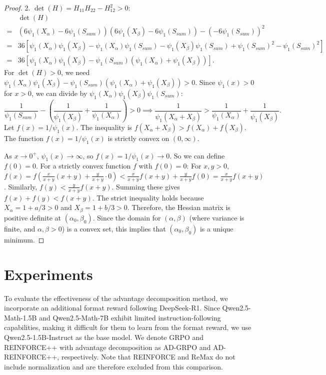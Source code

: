 \documentclass{article}
\theoremstyle{plain}
\theoremstyle{definition}
\theoremstyle{remark}
\begin{document}
\begin{proof}
2. $\det(H) = H_{11}H_{22} - H_{12}^2 > 0$:
\begin{align*} &\det(H) \\
=& (6\psi_1(X_\alpha) - 6\psi_1(S_{sum}))(6\psi_1(X_\beta) - 6\psi_1(S_{sum})) - (-6\psi_1(S_{sum}))^2 \\ 
=& 36 [ \psi_1(X_\alpha)\psi_1(X_\beta) - \psi_1(X_\alpha)\psi_1(S_{sum}) - \psi_1(X_\beta)\psi_1(S_{sum}) + \psi_1(S_{sum})^2 - \psi_1(S_{sum})^2 ] \\ 
=& 36 [ \psi_1(X_\alpha)\psi_1(X_\beta) - \psi_1(S_{sum})(\psi_1(X_\alpha)+\psi_1(X_\beta)) ].\end{align*}
For $\det(H)>0$, we need $\psi_1(X_\alpha)\psi_1(X_\beta) - \psi_1(S_{sum})(\psi_1(X_\alpha)+\psi_1(X_\beta)) > 0$.
Since $\psi_1(x)>0$ for $x>0$, we can divide by $\psi_1(X_\alpha)\psi_1(X_\beta)\psi_1(S_{sum})$:
\[ \frac{1}{\psi_1(S_{sum})} - \left(\frac{1}{\psi_1(X_\beta)} + \frac{1}{\psi_1(X_\alpha)}\right) > 0 \implies \frac{1}{\psi_1(X_\alpha+X_\beta)} > \frac{1}{\psi_1(X_\alpha)} + \frac{1}{\psi_1(X_\beta)}. \]
Let $f(x) = 1/\psi_1(x)$. The inequality is $f(X_\alpha+X_\beta) > f(X_\alpha) + f(X_\beta)$.
The function $f(x)=1/\psi_1(x)$ is strictly convex on $(0, \infty)$.

As $x \to 0^+$, $\psi_1(x) \to \infty$, so $f(x) = 1/\psi_1(x) \to 0$. So we can define $f(0)=0$.
For a strictly convex function $f$ with $f(0)=0$:
For $x,y>0$, $f(x) = f(\frac{x}{x+y}(x+y) + \frac{y}{x+y} \cdot 0) < \frac{x}{x+y}f(x+y) + \frac{y}{x+y}f(0) = \frac{x}{x+y}f(x+y)$.
Similarly, $f(y) < \frac{y}{x+y}f(x+y)$.
Summing these gives $f(x)+f(y) < f(x+y)$.
The strict inequality holds because $X_\alpha = 1+a/3 > 0$ and $X_\beta = 1+b/3 > 0$.
Therefore, the Hessian matrix is positive definite at $(\alpha_0, \beta_0)$. Since the domain for $(\alpha,\beta)$ (where variance is finite, and $\alpha,\beta>0$) is a convex set, this implies that $(\alpha_0, \beta_0)$ is a unique minimum.
\end{proof}




\section{Experiments}
To evaluate the effectiveness of the advantage decomposition method, we incorporate an additional format reward following DeepSeek-R1. Since Qwen2.5-Math-1.5B and Qwen2.5-Math-7B exhibit limited instruction-following capabilities, making it difficult for them to learn from the format reward, we use Qwen2.5-1.5B-Instruct as the base model. We denote GRPO and REINFORCE++ with advantage decomposition as AD-GRPO and AD-REINFORCE++, respectively. Note that REINFORCE and ReMax do not include normalization and are therefore excluded from this comparison.
\end{document}
